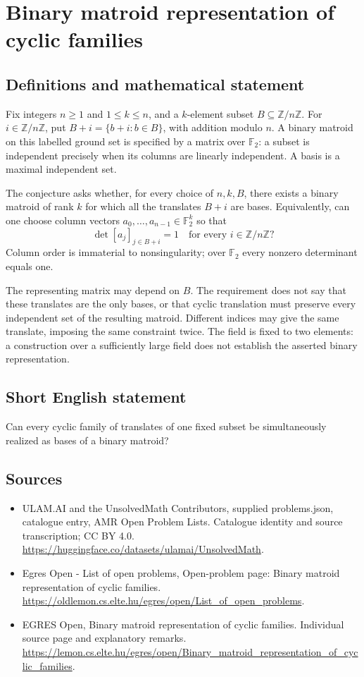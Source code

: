 \documentclass[11pt,a4paper]{article}
\begin{document}
\section*{Binary matroid representation of cyclic families}\label{statement}

\subsection{Definitions and mathematical statement}
Fix integers $n\ge1$ and $1\le k\le n$, and a $k$-element subset
$B\subseteq\mathbb Z/n\mathbb Z$. For $i\in\mathbb Z/n\mathbb Z$, put
$B+i=\{b+i:b\in B\}$, with addition modulo $n$.
A binary matroid on this labelled ground set is specified by a matrix
over $\mathbb F_2$: a subset is independent precisely when its columns
are linearly independent. A basis is a maximal independent set.

The conjecture asks whether, for every choice of $n,k,B$, there exists
a binary matroid of rank $k$ for which all the translates $B+i$ are bases.
Equivalently, can one choose column vectors $a_0,\ldots,a_{n-1}\in\mathbb F_2^k$
so that
\[
              \det[a_j]_{j\in B+i}=1
                       \quad\text{for every }i\in\mathbb Z/n\mathbb Z?
\]
Column order is immaterial to nonsingularity; over $\mathbb F_2$ every
nonzero determinant equals one.

The representing matrix may depend on $B$. The requirement does not say
that these translates are the only bases, or that cyclic translation
must preserve every independent set of the resulting matroid. Different
indices may give the same translate, imposing the same constraint twice.
The field is fixed to two elements: a construction over a sufficiently
large field does not establish the asserted binary representation.
\subsection{Short English statement}
Can every cyclic family of translates of one fixed subset be
simultaneously realized as bases of a binary matroid?
\subsection{Sources}
\begin{itemize}
\item[S1] ULAM.AI and the UnsolvedMath Contributors, supplied problems.json, catalogue entry, AMR Open Problem Lists. Catalogue identity and source transcription; CC BY 4.0.
\url{https://huggingface.co/datasets/ulamai/UnsolvedMath}.
\item[S2] Egres Open - List of open problems, Open-problem page: Binary matroid representation of cyclic families. 
\url{https://oldlemon.cs.elte.hu/egres/open/List_of_open_problems}.
\item[S3] EGRES Open, Binary matroid representation of cyclic families. Individual source page and explanatory remarks.
\url{https://lemon.cs.elte.hu/egres/open/Binary_matroid_representation_of_cyclic_families}.
\end{itemize}
\end{document}

